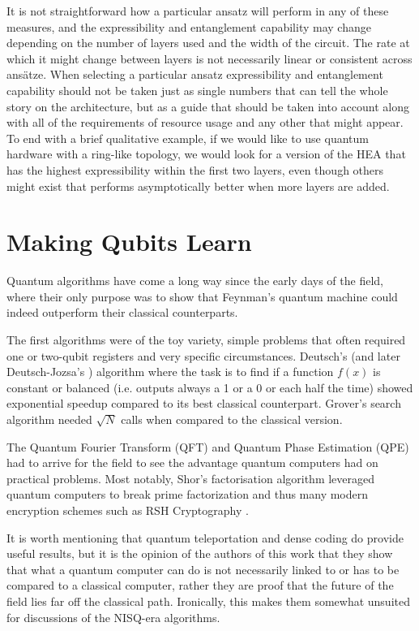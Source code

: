 It is not straightforward how a particular ansatz will perform in any of these measures, and the expressibility and entanglement capability may change depending on the number of layers used and the width of the circuit. The rate at which it might change between layers is not necessarily linear or consistent across ans{\"a}tze. When selecting a particular ansatz expressibility and entanglement capability should not be taken just as single numbers that can tell the whole story on the architecture, but as a guide that should be taken into account along with all of the requirements of resource usage and any other that might appear. To end with a brief qualitative example, if we would like to use quantum hardware with a ring-like topology, we would look for a version of the HEA that has the highest expressibility within the first two layers, even though others might exist that performs asymptotically better when more layers are added.

\section{Making Qubits Learn}
Quantum algorithms have come a long way since the early days of the field, where their only purpose was to show that Feynman's quantum machine could indeed outperform their classical counterparts.

The first algorithms were of the toy variety, simple problems that often required one or two-qubit registers and very specific circumstances. Deutsch's \cite{deutsch_quantum_1985} (and later Deutsch-Jozsa's \cite{jozsa_role_2003}) algorithm where the task is to find if a function $f(x)$ is constant or balanced (i.e. outputs always a 1 or a 0 or each half the time) showed exponential speedup compared to its best classical counterpart. Grover's search algorithm \cite{jozsa_searching_1999} needed $\sqrt{N}$ calls when compared to the classical version.

The Quantum Fourier Transform (QFT) \cite{weinstein_implementation_2001} and Quantum Phase Estimation (QPE) \cite{jiang_survey_2021} had to arrive for the field to see the advantage quantum computers had on practical problems. Most notably, Shor's factorisation algorithm leveraged quantum computers to break prime factorization and thus many modern encryption schemes such as RSH Cryptography \cite{wong_shors_2024}.

It is worth mentioning that quantum teleportation \cite{pirandola_advances_2015} and dense coding \cite{guo_advances_2019} do provide useful results, but it is the opinion of the authors of this work that they show that what a quantum computer can do is not necessarily linked to or has to be compared to a classical computer, rather they are proof that the future of the field lies far off the classical path. Ironically, this makes them somewhat unsuited for discussions of the NISQ-era algorithms.


